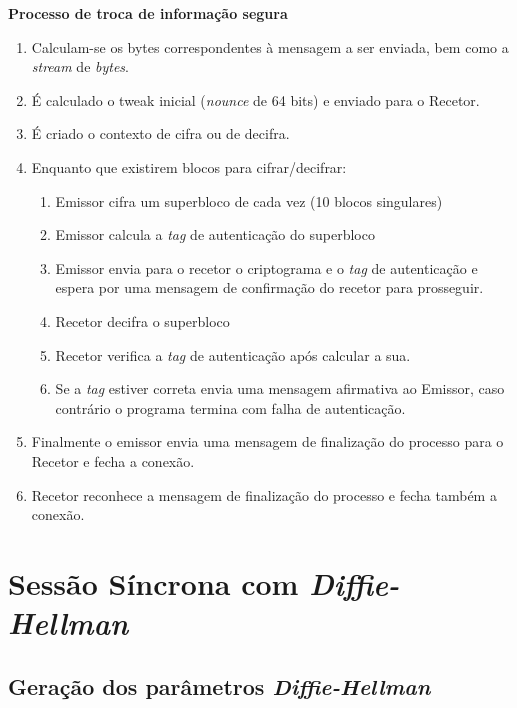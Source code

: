 \documentclass[11pt]{article}
\providecommand{\tightlist}{%
      \setlength{\itemsep}{0pt}\setlength{\parskip}{0pt}}
\begin{document}
\textbf{Processo de troca de informação segura}

\begin{enumerate}
\def\labelenumi{\arabic{enumi}.}
\tightlist
\item
  Calculam-se os bytes correspondentes à mensagem a ser enviada, bem
  como a \emph{stream} de \emph{bytes}.
\item
  É calculado o tweak inicial (\emph{nounce} de 64 bits) e enviado para
  o Recetor.
\item
  É criado o contexto de cifra ou de decifra.
\item
  Enquanto que existirem blocos para cifrar/decifrar:

  \begin{enumerate}
  \def\labelenumii{\arabic{enumii}.}
  \tightlist
  \item
    Emissor cifra um superbloco de cada vez (10 blocos singulares)
  \item
    Emissor calcula a \emph{tag} de autenticação do superbloco
  \item
    Emissor envia para o recetor o criptograma e o \emph{tag} de
    autenticação e espera por uma mensagem de confirmação do recetor
    para prosseguir.
  \item
    Recetor decifra o superbloco
  \item
    Recetor verifica a \emph{tag} de autenticação após calcular a sua.
  \item
    Se a \emph{tag} estiver correta envia uma mensagem afirmativa ao
    Emissor, caso contrário o programa termina com falha de
    autenticação.
  \end{enumerate}
\item
  Finalmente o emissor envia uma mensagem de finalização do processo
  para o Recetor e fecha a conexão.
\item
  Recetor reconhece a mensagem de finalização do processo e fecha também
  a conexão.
\end{enumerate}

    \hypertarget{sessuxe3o-suxedncrona-com-diffie-hellman}{%
\section{\texorpdfstring{Sessão Síncrona com
\emph{Diffie-Hellman}}{Sessão Síncrona com Diffie-Hellman}}\label{sessuxe3o-suxedncrona-com-diffie-hellman}}

    \hypertarget{gerauxe7uxe3o-dos-paruxe2metros-diffie-hellman}{%
\subsection{\texorpdfstring{Geração dos parâmetros
\emph{Diffie-Hellman}}{Geração dos parâmetros Diffie-Hellman}}\label{gerauxe7uxe3o-dos-paruxe2metros-diffie-hellman}}
\end{document}

